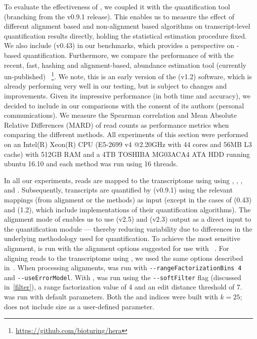 To evaluate the effectiveness of \sla, we coupled it with the quantification tool \salmon (branching from the v0.9.1 
release). This enables us to measure the effect of different alignment based and non-alignment based algorithms on 
transcript-level quantification results directly, holding the statistical estimation procedure fixed. We also include 
\kallisto(v0.43) in our benchmarks, which provides a perspective on \pa-based quantification. Furthermore, we compare 
the performance of \sla with the recent, fast, hashing and alignment-based, abundance estimation tool (currently un-published) 
\hera~\footnote{\url{https://github.com/bioturing/hera}}. We note, this is an early version of the \hera(v1.2) software, 
which is already performing very well in our testing, but is subject to changes and improvements. Given its impressive 
performance (in both time and accuracy), we decided to include \hera in our comparisons with the consent of its authors 
(personal communications). We measure the Spearman correlation and Mean Absolute Relative Differences (MARD) of read 
counts as performance metrics when comparing the different methods.
All experiments of this section were performed on an Intel(R) Xeon(R) CPU (E5-2699 v4 @2.20GHz 
with 44 cores and 56MB L3 cache) with 512GB RAM and a 4TB TOSHIBA MG03ACA4 ATA HDD running ubuntu 16.10 and each method 
was run using 16 threads.

In all our experiments, reads are mapped to the transcriptome using using \bt, \kallisto, \hera, \sla and \STAR. 
Subsequently, transcripts are quantified by \salmon(v0.9.1) using the relevant mappings (from alignment or the 
\nab methods) as input (except in the cases of \kallisto(0.43) and \hera(1.2), which include implementations of 
their quantification algorithms). The alignment mode of \salmon enables us to use \STAR(v2.5) and \bt(v2.3) output 
as a direct input to the quantification module --- thereby reducing variability due to differences in the 
underlying methodology used for quantification. To achieve the most sensitive alignment, \bt is run with the 
alignment options suggested for use with \rsem~\citep{rsembmc}. For aligning reads to the transcriptome using 
\STAR, we used the same options described in~\citep{Srivastava2016rapmap}. When processing alignments, \salmon 
was run with \texttt{-{}-rangeFactorizationBins 4}~\citep{ismb2017factorization} and \texttt{-{}-useErrorModel}. 
With \sla, \salmon was run using the \texttt{-{}-softFilter} flag (discussed in~\cref{filter}), 
a range factorization value of 4 and an edit distance threshold of 7. \Kallisto was run with default parameters. 
Both the \sla and \kallisto indices were built with $k=25$; \hera does not include \kmer size as a user-defined 
parameter.

